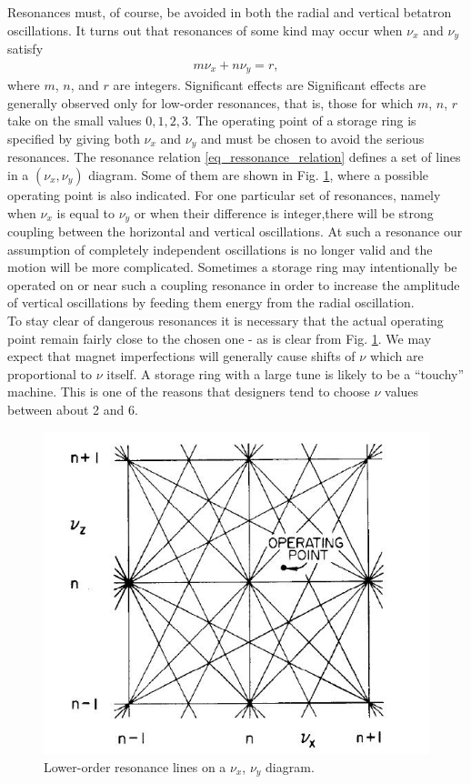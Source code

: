 Resonances must, of course, be avoided in both the radial and vertical betatron oscillations. It turns out that resonances of some kind may occur when $\nu_x$ and $\nu_y$ satisfy
\begin{align}\label{eq_ressonance_relation}
	m \nu_x + n \nu_y = r,
\end{align}
where $m$, $n$, and $r$ are integers. Significant effects are  Significant effects are generally observed only for low-order resonances, that is, those for which $m$, $n$, $r$ take on the small values $0, 1, 2, 3$. The operating point of a storage ring is specified by giving both $\nu_x$
and $\nu_y$ and must be chosen to avoid the serious resonances. The resonance relation \eqref{eq_ressonance_relation} defines a set of lines in a $(\nu_x, \nu_y)$ diagram. Some of them are shown in Fig. \ref{fig:lower_order_resonance_lines}, where a possible operating point is also indicated. For one particular set of resonances, namely when $\nu_x$ is equal to $\nu_y$ or when their difference is integer,there will be strong coupling between the horizontal and vertical oscillations. At such a resonance our assumption of completely independent oscillations is no longer valid and the motion will be more complicated. Sometimes a storage ring may intentionally be operated on or near such a coupling resonance in order to increase the amplitude of vertical oscillations by feeding them energy from the radial oscillation. \\
To stay clear of dangerous resonances it is necessary that the actual operating point remain fairly close to the chosen one - as is clear from Fig. \ref{fig:lower_order_resonance_lines}. We may expect that magnet imperfections will generally cause shifts of $\nu$ which are proportional to $\nu$ itself. A storage ring with a large tune is likely to be a “touchy” machine. This is one of the reasons that designers tend to choose $\nu$ values between about 2 and 6.

\begin{figure}[!htb]
	\centering
	\includegraphics[width=0.7\linewidth]{./Figuras/fig14.jpeg}
	\caption{Lower-order resonance lines on a $\nu_x$, $\nu_y$ diagram.}
	\label{fig:lower_order_resonance_lines}
\end{figure}
